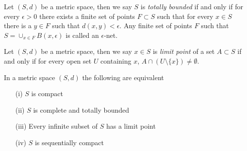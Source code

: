 \begin{defn}Let $(S,d)$ be a metric space, then we say $S$
  is \emph{totally bounded} if and only if for every $\epsilon >0$
  there exists a finite set of points $F \subset S$ such that for
  every $x\in S$ there is a $y \in F$ such that $d(x,y) < \epsilon$.
  Any finite set of points $F$ such that $S = \cup_{x \in F} B(x,
  \epsilon)$ is called an $\epsilon$-net.
\end{defn}

\begin{defn}Let $(S,d)$ be a metric space, then we say $x \in S$
  is \emph{limit point} of a set $A \subset S$ if and only if for
  every open set $U$ containing $x$, $A \cap (U \setminus \lbrace x
  \rbrace) \neq \emptyset$.
\end{defn}

\begin{thm}\label{CompactnessInMetricSpaces}In a metric space $(S,d)$ the following are equivalent
\begin{itemize}
\item[(i)]$S$ is compact
\item[(ii)]$S$ is complete and totally bounded
\item[(iii)]Every infinite subset of $S$ has a limit point
\item[(iv)]$S$ is sequentially compact
\end{itemize}
\end{thm}
